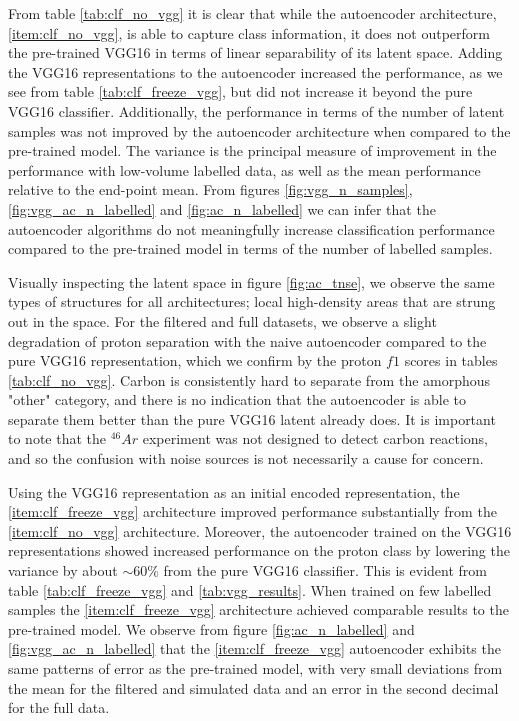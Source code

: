 From table \ref{tab:clf_no_vgg} it is clear that while the autoencoder architecture, \ref{item:clf_no_vgg}, is able to capture class information, it does not outperform the pre-trained VGG16 in terms of linear separability of its latent space. Adding the VGG16 representations to the autoencoder increased the performance, as we see from table \ref{tab:clf_freeze_vgg}, but did not increase it beyond the pure VGG16 classifier.  Additionally, the performance in terms of the number of latent samples was not improved by the autoencoder architecture when compared to the pre-trained model. The variance is the principal measure of improvement in the performance with low-volume labelled data, as well as the mean performance relative to the end-point mean. From figures \ref{fig:vgg_n_samples}, \ref{fig:vgg_ac_n_labelled}  and \ref{fig:ac_n_labelled} we can infer that the autoencoder algorithms do not meaningfully increase classification performance compared to the pre-trained model in terms of the number of labelled samples.

Visually inspecting the latent space in figure \ref{fig:ac_tnse}, we observe the same types of structures for all architectures; local high-density areas that are strung out in the space. For the filtered and full datasets, we observe a slight degradation of proton separation with the naive autoencoder compared to the pure VGG16 representation, which we confirm by the proton $f1$ scores in tables \ref{tab:clf_no_vgg}. Carbon is consistently hard to separate from the amorphous "other" category, and there is no indication that the autoencoder is able to separate them better than the pure VGG16 latent already does. It is important to note that the ${}^{46}Ar$ experiment was not designed to detect carbon reactions, and so the confusion with noise sources is not necessarily a cause for concern. 

Using the VGG16 representation as an initial encoded representation, the \ref{item:clf_freeze_vgg} architecture improved performance substantially from the \ref{item:clf_no_vgg} architecture. Moreover, the autoencoder trained on the VGG16 representations showed increased performance on the proton class by lowering the variance by about $\sim 60\%$ from the pure VGG16 classifier. This is evident from table \ref{tab:clf_freeze_vgg} and \ref{tab:vgg_results}. When trained on few labelled samples the \ref{item:clf_freeze_vgg} architecture achieved comparable results to the pre-trained model. We observe from figure \ref{fig:ac_n_labelled} and \ref{fig:vgg_ac_n_labelled} that the \ref{item:clf_freeze_vgg} autoencoder exhibits the same patterns of error as the pre-trained model, with very small deviations from the mean for the filtered and simulated data and an error in the second decimal for the full data.

